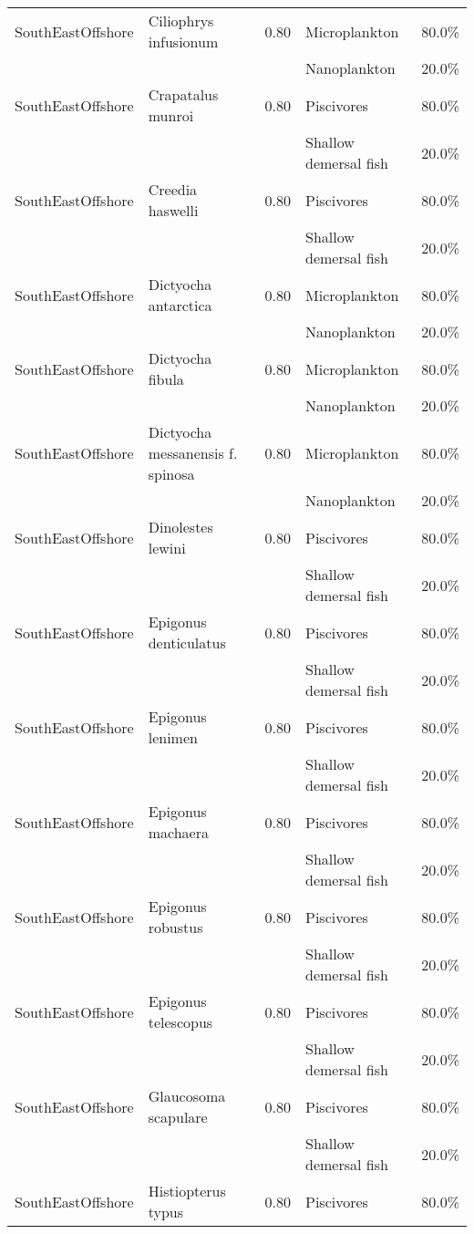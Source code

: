 \begin{longtable}{llcll}
\hline
SouthEastOffshore & Ciliophrys infusionum & 0.80 & Microplankton & 80.0\% \\
& & & Nanoplankton & 20.0\% \\
\hline
SouthEastOffshore & Crapatalus munroi & 0.80 & Piscivores & 80.0\% \\
& & & Shallow demersal fish & 20.0\% \\
\hline
SouthEastOffshore & Creedia haswelli & 0.80 & Piscivores & 80.0\% \\
& & & Shallow demersal fish & 20.0\% \\
\hline
SouthEastOffshore & Dictyocha antarctica & 0.80 & Microplankton & 80.0\% \\
& & & Nanoplankton & 20.0\% \\
\hline
SouthEastOffshore & Dictyocha fibula & 0.80 & Microplankton & 80.0\% \\
& & & Nanoplankton & 20.0\% \\
\hline
SouthEastOffshore & Dictyocha messanensis f. spinosa & 0.80 & Microplankton & 80.0\% \\
& & & Nanoplankton & 20.0\% \\
\hline
SouthEastOffshore & Dinolestes lewini & 0.80 & Piscivores & 80.0\% \\
& & & Shallow demersal fish & 20.0\% \\
\hline
SouthEastOffshore & Epigonus denticulatus & 0.80 & Piscivores & 80.0\% \\
& & & Shallow demersal fish & 20.0\% \\
\hline
SouthEastOffshore & Epigonus lenimen & 0.80 & Piscivores & 80.0\% \\
& & & Shallow demersal fish & 20.0\% \\
\hline
SouthEastOffshore & Epigonus machaera & 0.80 & Piscivores & 80.0\% \\
& & & Shallow demersal fish & 20.0\% \\
\hline
SouthEastOffshore & Epigonus robustus & 0.80 & Piscivores & 80.0\% \\
& & & Shallow demersal fish & 20.0\% \\
\hline
SouthEastOffshore & Epigonus telescopus & 0.80 & Piscivores & 80.0\% \\
& & & Shallow demersal fish & 20.0\% \\
\hline
SouthEastOffshore & Glaucosoma scapulare & 0.80 & Piscivores & 80.0\% \\
& & & Shallow demersal fish & 20.0\% \\
\hline
SouthEastOffshore & Histiopterus typus & 0.80 & Piscivores & 80.0\% \\

\end{longtable}
